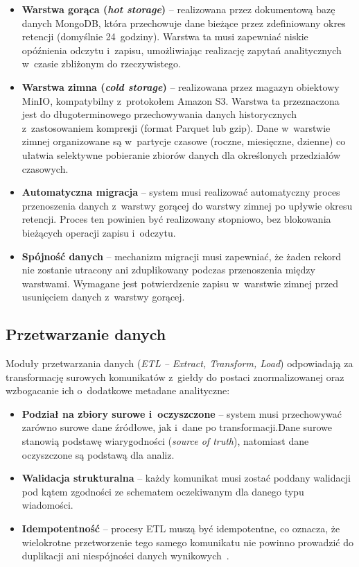 \begin{itemize}
    \item \textbf{Warstwa gorąca (\textit{hot storage})} -- realizowana przez dokumentową bazę danych MongoDB, która
    przechowuje dane bieżące przez zdefiniowany okres retencji (domyślnie 24~godziny).
    Warstwa ta musi zapewniać niskie opóźnienia odczytu i~zapisu, umożliwiając realizację zapytań analitycznych
    w~czasie zbliżonym do rzeczywistego.
    \item \textbf{Warstwa zimna (\textit{cold storage})} -- realizowana przez magazyn obiektowy MinIO, kompatybilny
    z~protokołem Amazon S3.
    Warstwa ta przeznaczona jest do długoterminowego przechowywania danych historycznych z~zastosowaniem kompresji
    (format Parquet lub gzip).
    Dane w~warstwie zimnej organizowane są w~partycje czasowe (roczne, miesięczne, dzienne) co ułatwia selektywne
    pobieranie zbiorów danych dla określonych przedziałów czasowych.
    \item \textbf{Automatyczna migracja} -- system musi realizować automatyczny proces przenoszenia danych z~warstwy
    gorącej do warstwy zimnej po upływie okresu retencji.
    Proces ten powinien być realizowany stopniowo, bez blokowania bieżących operacji zapisu i~odczytu.
    \item \textbf{Spójność danych} -- mechanizm migracji musi zapewniać, że żaden rekord nie zostanie utracony ani
    zduplikowany podczas przenoszenia między warstwami.
    Wymagane jest potwierdzenie zapisu w~warstwie zimnej przed usunięciem danych z~warstwy gorącej.
\end{itemize}

\subsection{Przetwarzanie danych}
\label{subsec:przetwarzanie_danych}

Moduły przetwarzania danych (\textit{ETL -- Extract, Transform, Load}) odpowiadają za transformację surowych
komunikatów z~giełdy do postaci znormalizowanej oraz wzbogacanie ich o~dodatkowe metadane analityczne:

\begin{itemize}
    \item \textbf{Podział na zbiory surowe i~oczyszczone} -- system musi przechowywać zarówno surowe dane źródłowe, jak
    i~dane po transformacji.Dane surowe stanowią podstawę wiarygodności (\textit{source of truth}), natomiast dane oczyszczone
    są podstawą dla analiz.
    \item \textbf{Walidacja strukturalna} -- każdy komunikat musi zostać poddany walidacji pod kątem zgodności ze
    schematem oczekiwanym dla danego typu wiadomości.
    \item \textbf{Idempotentność} -- procesy ETL muszą być idempotentne, co oznacza, że wielokrotne przetworzenie
    tego samego komunikatu nie powinno prowadzić do duplikacji ani niespójności danych wynikowych~\cite{rfc7231}.
\end{itemize}

